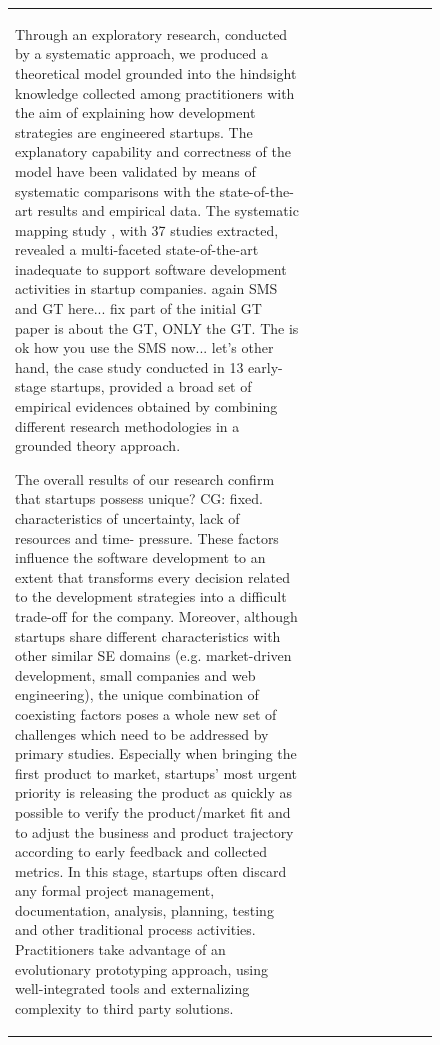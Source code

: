 \documentclass[12pt,journal,compsoc]{../sty/IEEEtran}
\begin{document}
\begin{table}[!t]
\begin{figure}[!t]
\begin{compactitem}
\begin{table}[!t]
\begin{tabular}{|l||c||c||c||c||c||c||c||c||c|}
\begin{compactitem}
Through an exploratory research, conducted by a systematic approach, we
produced a theoretical model grounded into the hindsight knowledge collected
among practitioners with the aim of explaining how development strategies are
engineered startups. The explanatory capability and correctness of the model
have been validated by means of systematic comparisons with the state-of-the-art
results and empirical data. The systematic mapping study \cite{SMS},  with 37
studies extracted, revealed a  multi-faceted state-of-the-art inadequate to
support software development  activities in startup companies. %
again SMS and GT here... fix  %
part of the initial GT  %
paper is about the GT, ONLY the GT. The  %
is ok how you use the SMS now... let's  %
other hand, the case study conducted in 13 early-stage startups,  provided a
broad set of empirical evidences obtained by combining different  research
methodologies in a grounded theory approach.

The overall results of our research confirm that startups possess %
unique? CG: fixed. characteristics of uncertainty, lack of resources and time-
pressure. These  factors influence the software development to an extent that
transforms every  decision related to the development strategies into a
difficult trade-off for  the company. Moreover, although startups share
different characteristics with  other similar SE domains (e.g. market-driven
development, small companies and  web engineering), the unique combination of
coexisting factors poses a whole new  set of challenges which need to be
addressed by primary studies. Especially when  bringing the first product to
market, startups' most urgent priority is  releasing the product as quickly as
possible to verify the product/market fit  and to adjust the business and
product trajectory according to early feedback  and collected metrics. In this
stage, startups often discard any formal project  management, documentation,
analysis, planning, testing and other traditional  process activities.
Practitioners take advantage of an evolutionary prototyping  approach, using
well-integrated tools and externalizing complexity to third  party solutions.


\end{compactitem}
\end{tabular}
\end{table}
\end{compactitem}
\end{figure}
\end{table}
\end{document}
